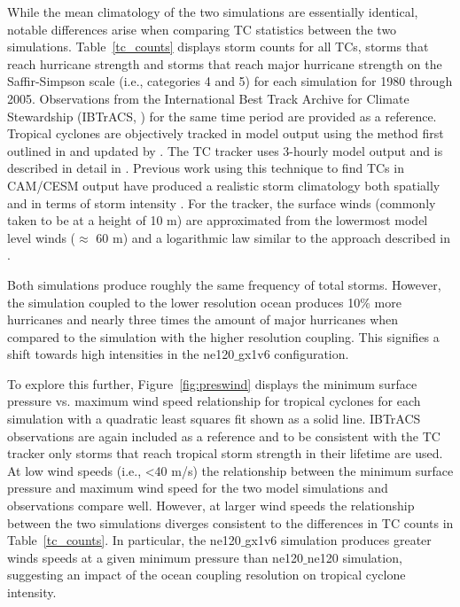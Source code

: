\documentclass[draft,ms]{AGUTeX}
\begin{document}
\begin{article}
While the mean climatology of the two simulations are essentially identical, notable differences arise when comparing TC statistics between the two simulations.  Table~\ref{tc_counts} displays storm counts for all TCs, storms that reach hurricane strength and storms that reach major hurricane strength on the Saffir-Simpson scale \citep{Simpson1974} (i.e., categories 4 and 5) for each simulation for 1980 through 2005. Observations from the International Best Track Archive for Climate Stewardship (IBTrACS, \citet{Knapp2010}) for the same time period are provided as a reference. Tropical cyclones are objectively tracked in model output using the method first outlined in \citet{Vitart1997} and updated by \citet{Knutson2007}. The TC tracker uses 3-hourly model output and is described in detail in \citet{Zhao2009}. Previous work using this technique to find TCs in CAM/CESM output have produced a realistic storm climatology both spatially and in terms of storm intensity \citet{Reed2015}. For the tracker, the surface winds (commonly taken to be at a height of 10 m) are approximated from the lowermost model level winds ($\approx$ 60 m) and a logarithmic law similar to the approach described in \citet{Zarzycki2014AMIPTCs}.

Both simulations produce roughly the same frequency of total storms.  However, the simulation coupled to the lower resolution ocean produces 10$\%$ more hurricanes and nearly three times the amount of major hurricanes when compared to the simulation with the higher resolution coupling. This signifies a shift towards high intensities in the ne120$\_$gx1v6 configuration.

To explore this further, Figure~\ref{fig:preswind} displays the minimum surface pressure vs. maximum wind speed relationship for tropical cyclones for each simulation with a quadratic least squares fit shown as a solid line. IBTrACS observations are again included as a reference and to be consistent with the TC tracker only storms that reach tropical storm strength in their lifetime are used. At low wind speeds (i.e., \textless 40 m/s) the relationship between the minimum surface pressure and maximum wind speed for the two model simulations and observations compare well.  However, at larger wind speeds the relationship between the two simulations diverges consistent to the differences in TC counts in Table~\ref{tc_counts}. In particular, the ne120$\_$gx1v6 simulation produces greater winds speeds at a given minimum pressure than ne120$\_$ne120 simulation, suggesting an impact of the ocean coupling resolution on tropical cyclone intensity.


\end{article}
\end{document}
